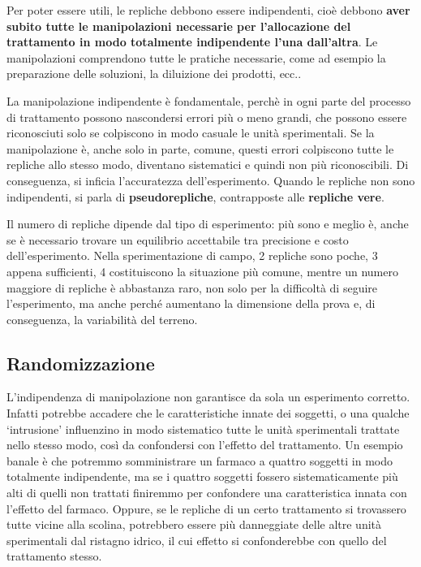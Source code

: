\documentclass[a4paper,12pt,oneside]{book}
\begin{document}
Per poter essere utili, le repliche debbono essere indipendenti, cioè
debbono \textbf{aver subito tutte le manipolazioni necessarie per
l'allocazione del trattamento in modo totalmente indipendente l'una
dall'altra}. Le manipolazioni comprendono tutte le pratiche necessarie,
come ad esempio la preparazione delle soluzioni, la diluizione dei
prodotti, ecc..

La manipolazione indipendente è fondamentale, perchè in ogni parte del
processo di trattamento possono nascondersi errori più o meno grandi,
che possono essere riconosciuti solo se colpiscono in modo casuale le
unità sperimentali. Se la manipolazione è, anche solo in parte, comune,
questi errori colpiscono tutte le repliche allo stesso modo, diventano
sistematici e quindi non più riconoscibili. Di conseguenza, si inficia
l'accuratezza dell'esperimento. Quando le repliche non sono
indipendenti, si parla di \textbf{pseudorepliche}, contrapposte alle
\textbf{repliche vere}.

Il numero di repliche dipende dal tipo di esperimento: più sono e meglio
è, anche se è necessario trovare un equilibrio accettabile tra
precisione e costo dell'esperimento. Nella sperimentazione di campo, 2
repliche sono poche, 3 appena sufficienti, 4 costituiscono la situazione
più comune, mentre un numero maggiore di repliche è abbastanza raro, non
solo per la difficoltà di seguire l'esperimento, ma anche perché
aumentano la dimensione della prova e, di conseguenza, la variabilità
del terreno.

\subsection{Randomizzazione}\label{randomizzazione}

L'indipendenza di manipolazione non garantisce da sola un esperimento
corretto. Infatti potrebbe accadere che le caratteristiche innate dei
soggetti, o una qualche `intrusione' influenzino in modo sistematico
tutte le unità sperimentali trattate nello stesso modo, così da
confondersi con l'effetto del trattamento. Un esempio banale è che
potremmo somministrare un farmaco a quattro soggetti in modo totalmente
indipendente, ma se i quattro soggetti fossero sistematicamente più alti
di quelli non trattati finiremmo per confondere una caratteristica
innata con l'effetto del farmaco. Oppure, se le repliche di un certo
trattamento si trovassero tutte vicine alla scolina, potrebbero essere
più danneggiate delle altre unità sperimentali dal ristagno idrico, il
cui effetto si confonderebbe con quello del trattamento stesso.
\end{document}
